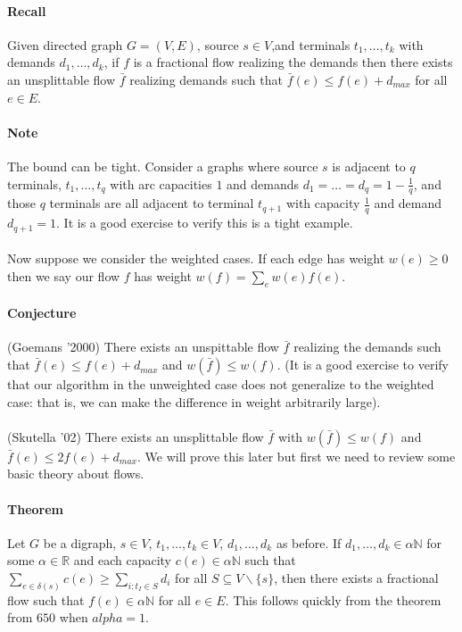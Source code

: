 \documentclass[letterpaper,12pt,oneside,onecolumn]{article}
\newcommand{\N}{\mathbb{N}} \newcommand{\R}{\mathbb{R}}
\begin{document}
\paragraph{Recall}
Given directed graph $G=(V,E)$, source $s \in V$,and terminals $t_1,\dots,t_k$ with demands $d_1, \dots, d_k$, if $f$ is a fractional flow realizing the demands then there exists an unsplittable flow $\bar{f}$ realizing demands such that $\bar{f}(e) \leq f(e) + d_{max}$ for all $e \in E$.
\paragraph{Note}
The bound can be tight. Consider a graphs where source $s$ is adjacent to $q$ terminals, $t_1,\dots,t_q$ with arc capacities $1$ and demands $d_1=\dots=d_q=1-\frac{1}{q}$, and those $q$ terminals are all adjacent to terminal $t_{q+1}$ with capacity $\frac{1}{q}$ and demand $d_{q+1} = 1$. It is a good exercise to verify this is a tight example.
\paragraph{}
Now suppose we consider the weighted cases. If each edge has weight $w(e)\geq 0$ then we say our flow $f$ has weight $w(f) = \sum_e w(e) f(e)$.
\paragraph{Conjecture}(Goemans '2000) There exists an unspittable flow $\bar{f}$ realizing the demands such that $\bar{f}(e) \leq f(e) + d_{max}$ and $w(\bar{f}) \leq w(f)$. (It is a good exercise to verify that our algorithm in the unweighted case does not generalize to the weighted case: that is, we can make the difference in weight arbitrarily large).
\paragraph{}(Skutella '02) There exists an unsplittable flow $\bar{f}$ with $w(\bar{f})\leq w(f)$ and $\bar{f}(e) \leq 2f(e) + d_{max}$. We will prove this later but first we need to review some basic theory about flows.
\paragraph{Theorem} Let $G$ be a digraph, $s \in V$, $t_1,\dots, t_k \in V$, $d_1,\dots, d_k$ as before. If $d_1,\dots,d_k \in \alpha \N$ for some $\alpha \in \R$ and each capacity $c(e) \in \alpha \N$ such that $\sum_{e\in\delta(s)} c(e) \geq \sum_{i:t_I \in S} d_i$ for all $S \subseteq V\backslash\{s\}$, then there exists a fractional flow such that $f(e) \in \alpha \N$ for all $e\in E$. This follows quickly from the theorem from $650$ when $alpha =1 $.
\end{document}
